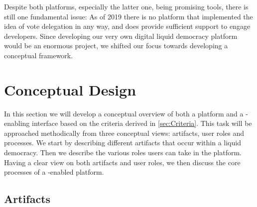 Despite both platforms, especially the latter one, being promising tools, there is still one fundamental issue: As of 2019 there is no  platform that implemented the idea of vote delegation in any way, and does provide sufficient support to engage developers. Since developing our very own digital liquid democracy platform would be an enormous project, we shifted our focus towards developing a conceptual framework.





\section{Conceptual Design}
\label{sec:Conceptual_Approach}
In this section we will develop a conceptual overview of both a  platform and a -enabling interface based on the criteria derived in \ref{sec:Criteria}.
This task will be approached methodically from three conceptual views: artifacts, user roles and processes.
We start by describing different artifacts that occur within a liquid democracy.
Then we describe the various roles users can take in the platform.
Having a clear view on both artifacts and user roles, we then discuss the core processes of a -enabled  platform.

\subsection{Artifacts}
\label{ssec:data_fragments}

